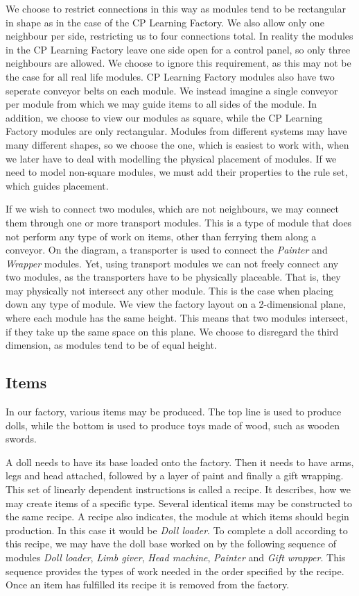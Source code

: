 We choose to restrict connections in this way as modules tend to be rectangular in shape as in the case of the CP Learning Factory. We also allow only one neighbour per side, restricting us to four connections total. In reality the modules in the CP Learning Factory leave one side open for a control panel, so only three neighbours are allowed. We choose to ignore this requirement, as this may not be the case for all real life modules. CP Learning Factory modules also have two seperate conveyor belts on each module. We instead imagine a single conveyor per module from which we may guide items to all sides of the module. In addition, we choose to view our modules as square, while the CP Learning Factory modules are only rectangular. Modules from different systems may have many different shapes, so we choose the one, which is easiest to work with, when we later have to deal with modelling the physical placement of modules. If we need to model non-square modules, we must add their properties to the rule set, which guides placement. 

If we wish to connect two modules, which are not neighbours, we may connect them through one or more transport modules. This is a type of module that does not perform any type of work on items, other than ferrying them along a conveyor. On the diagram, a transporter is used to connect the \textit{Painter} and \textit{Wrapper} modules. Yet, using transport modules we can not freely connect any two modules, as the transporters have to be physically placeable. That is, they may physically not intersect any other module. This is the case when placing down any type of module. We view the factory layout on a 2-dimensional plane, where each module has the same height. This means that two modules intersect, if they take up the same space on this plane. We choose to disregard the third dimension, as modules tend to be of equal height.  

\subsection{Items}
In our factory, various items may be produced. The top line is used to produce dolls, while the bottom is used to produce toys made of wood, such as wooden swords. 

A doll needs to have its base loaded onto the factory. Then it needs to have arms, legs and head attached, followed by a layer of paint and finally a gift wrapping. This set of linearly dependent instructions is called a recipe. It describes, how we may create items of a specific type. Several identical items may be constructed to the same recipe. A recipe also indicates, the module at which items should begin production. In this case it would be \textit{Doll loader}. To complete a doll according to this recipe, we may have the doll base worked on by the following sequence of modules \textit{Doll loader}, \textit{Limb giver}, \textit{Head machine}, \textit{Painter} and \textit{Gift wrapper}. This sequence provides the types of work needed in the order specified by the recipe. Once an item has fulfilled its recipe it is removed from the factory. 

